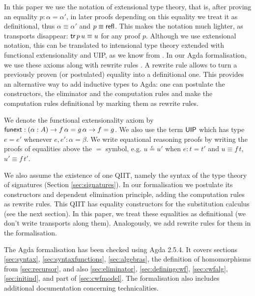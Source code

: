 \documentclass[acmsmall,screen]{acmart}
\begin{document}
In this paper we use the notation of extensional type theory, that is,
after proving an equality $p : \alpha=\alpha'$, in later proofs
depending on this equality we treat it as definitional, thus
$\alpha\equiv\alpha'$ and $p \equiv \mathsf{refl}$. This makes the notation
much lighter, as transports disappear: $\mathsf{tr}\,p\,u\equiv u$ for any
proof $p$. Although we use extensional notation, this can
be translated to intensional type theory extended with functional
extensionality and UIP, as we know from
\cite{hofmann95conservativity, Oury2005,theo}. In our Agda formalisation, we use these axioms
along with rewrite rules \cite{cockx}. A
rewrite rule allows to turn a previously proven (or postulated)
equality into a definitional one. %
This provides
an alternative way to add inductive types to Agda: one can postulate
the constructors, the eliminator and the computation rules and make
the computation rules definitional by marking them as rewrite rules.

We denote the functional extensionality axiom by $\mathsf{funext} : (\alpha :
A)\rightarrow f\,\alpha = g\,\alpha \rightarrow f = g$. We also use the term $\mathsf{UIP}$
which has type $e = e'$ whenever $e,e':\alpha=\beta$. We write
equational reasoning proofs by writing the proofs of equalities above
the $=$ symbol, e.g. $u \overset{e}{=} u'$ when $e:t = t'$ and
$u\equiv f\,t$, $u'\equiv f\,t'$.

We also assume the existence of one QIIT, namely the syntax of the
type theory of signatures (Section \ref{sec:signatures}). In our
formalisation we postulate its constructors and dependent elimination
principle, adding the computation rules as rewrite rules. This QIIT has
equality constructors for the substitution calculus (see the next
section). In this paper, we treat these equalities as definitional (we
don't write transports along them). Analogously, we add rewrite rules
for them in the formalisation.

The Agda formalisation has been checked using Agda 2.5.4. It covers
sections \ref{sec:syntax}, \ref{sec:syntaxfunctions},
\ref{sec:algebras}, the definition of homomorphisms from
\ref{sec:recursor}, and also \ref{sec:eliminator},
\ref{sec:definingcwf}, \ref{sec:cwfalg}, \ref{sec:initind}, and part
of \ref{sec:cwfmodel}. The formalisation also includes additional
documentation concerning technicalities.
\end{document}
